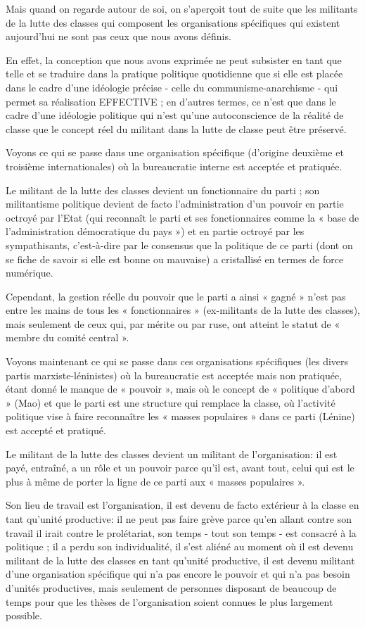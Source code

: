 Mais quand on regarde autour de soi, on s'aperçoit tout de suite que les militants de la lutte des classes qui composent les organisations spécifiques qui existent aujourd'hui ne sont pas ceux que nous avons définis.

En effet, la conception que nous avons exprimée ne peut subsister en tant que telle et se traduire dans la pratique politique quotidienne que si elle est placée dans le cadre d'une idéologie précise - celle du communisme-anarchisme - qui permet sa réalisation EFFECTIVE ; en d'autres termes, ce n'est que dans le cadre d'une idéologie politique qui n'est qu'une autoconscience de la réalité de classe que le concept réel du militant dans la lutte de classe peut être préservé.

Voyons ce qui se passe dans une organisation spécifique (d'origine deuxième et troisième internationales) où la bureaucratie interne est acceptée et pratiquée.

Le militant de la lutte des classes devient un fonctionnaire du parti ; son militantisme politique devient de facto l'administration d'un pouvoir en partie octroyé par l'Etat (qui reconnaît le parti et ses fonctionnaires comme la « base de l'administration démocratique du pays ») et en partie octroyé par les sympathisants, c'est-à-dire par le consensus que la politique de ce parti (dont on se fiche de savoir si elle est bonne ou mauvaise) a cristallisé en termes de force numérique.

Cependant, la gestion réelle du pouvoir que le parti a ainsi « gagné » n'est pas entre les mains de tous les « fonctionnaires » (ex-militants de la lutte des classes), mais seulement de ceux qui, par mérite ou par ruse, ont atteint le statut de « membre du comité central ».

Voyons maintenant ce qui se passe dans ces organisations spécifiques (les divers partis marxiste-léninistes) où la bureaucratie est acceptée mais non pratiquée, étant donné le manque de « pouvoir », mais où le concept de « politique d'abord » (Mao) et que le parti est une structure qui remplace la classe, où l'activité politique vise à faire reconnaître les « masses populaires » dans ce parti (Lénine) est accepté et pratiqué.

Le militant de la lutte des classes devient un militant de l'organisation: il est payé, entraîné, a un rôle et un pouvoir parce qu'il est, avant tout, celui qui est le plus à même de porter la ligne de ce parti aux « masses populaires ».

Son lieu de travail est l'organisation, il est devenu de facto extérieur à la classe en tant qu'unité productive: il ne peut pas faire grève parce qu'en allant contre son travail il irait contre le prolétariat, son temps - tout son temps - est consacré à la politique ; il a perdu son individualité, il s'est aliéné au moment où il est devenu militant de la lutte des classes en tant qu'unité productive, il est devenu militant d'une organisation spécifique qui n'a pas encore le pouvoir et qui n'a pas besoin d'unités productives, mais seulement de personnes disposant de beaucoup de temps pour que les thèses de l'organisation soient connues le plus largement possible.

